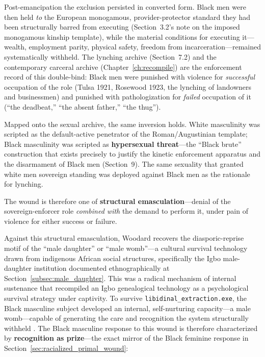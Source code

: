 Post-emancipation the exclusion persisted in converted form. Black men were then held \textit{to} the European monogamous, provider-protector standard they had been structurally barred from executing (Section~3.2's note on the imposed monogamous kinship template), while the material conditions for executing it---wealth, employment parity, physical safety, freedom from incarceration---remained systematically withheld. The lynching archive (Section~7.2) and the contemporary carceral archive (Chapter~\ref{ch:recompile}) are the enforcement record of this double-bind: Black men were punished with violence for \textit{successful} occupation of the role (Tulsa 1921, Rosewood 1923, the lynching of landowners and businessmen) and punished with pathologization for \textit{failed} occupation of it (``the deadbeat,'' ``the absent father,'' ``the thug'').

Mapped onto the sexual archive, the same inversion holds. White masculinity was scripted as the default-active penetrator of the Roman/Augustinian template; Black masculinity was scripted as \textbf{hypersexual threat}---the ``Black brute'' construction that exists precisely to justify the kinetic enforcement apparatus and the disarmament of Black men (Section~9). The same sexuality that granted white men sovereign standing was deployed against Black men as the rationale for lynching.

The wound is therefore one of \textbf{structural emasculation}---denial of the sovereign-enforcer role \textit{combined with} the demand to perform it, under pain of violence for either success or failure.

Against this structural emasculation, Woodard recovers the diasporic-reprise motif of the ``male daughter'' or ``male womb''---a cultural survival technology drawn from indigenous African social structures, specifically the Igbo male-daughter institution documented ethnographically at Section~\ref{subsec:male_daughter}. This was a radical mechanism of internal sustenance that recompiled an Igbo genealogical technology as a psychological survival strategy under captivity. To survive \texttt{libidinal\_extraction.exe}, the Black masculine subject developed an internal, self-nurturing capacity---a male womb---capable of generating the care and recognition the system structurally withheld \cite{woodard_delectable}. The Black masculine response to this wound is therefore characterized by \textbf{recognition as prize}---the exact mirror of the Black feminine response in Section~\ref{sec:racialized_primal_wound}:

